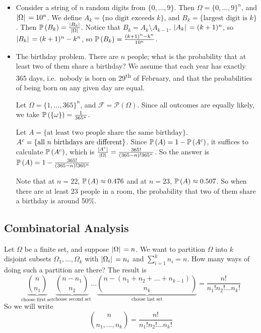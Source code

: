 \begin{itemize}
	\item Consider a string of \(n\) random digits from \(\{0, \dots, 9\}\).
	      Then \(\Omega = \{ 0, \dots, 9 \}^n\), and \(\abs*{\Omega} = 10^n\).
	      We define \(A_k = \{ \text{no digit exceeds } k \}\), and \(B_k = \{ \text{largest digit is } k \}\).
	      Then \(\mathbb{P}\left({B_k}\right) = \frac{\abs*{B_k}}{\abs*{\Omega}}\).
	      Notice that \(B_k = A_k \setminus A_{k-1}\).
	      \(\abs*{A_k} = (k+1)^n\), so \(\abs*{B_k} = (k+1)^n - k^n\), so \(\mathbb{P}\left({B_k}\right) = \frac{(k+1)^n - k^n}{10^n}\).
	      
	\item The birthday problem.
	      There are \(n\) people; what is the probability that at least two of them share a birthday?
	      We assume that each year has exactly 365 days, i.e.\ nobody is born on 29\textsuperscript{th} of February, and that the probabilities of being born on any given day are equal.
	      
	      Let \(\Omega = \{1, \dots, 365\}^n\), and \(\mathcal F = \mathcal P(\Omega)\).
	      Since all outcomes are equally likely, we take \(\mathbb{P}\left({\{\omega\}}\right) = \frac{1}{365^n}\).
	      
	      Let \(A = \{ \text{at least two people share the same birthday} \}\).
	      \({A}^c = \{ \text{all } n \text{ birthdays are different} \}\).
	      Since \(\mathbb{P}\left({A}\right) = 1 - \mathbb{P}\left({{A}^c}\right)\), it suffices to calculate \(\mathbb{P}\left({{A}^c}\right)\), which is \(\frac{\abs*{{A}^c}}{\abs*{\Omega}} = \frac{365!}{(365 - n)!365^n}\).
	      So the answer is \(\mathbb{P}\left({A}\right) = 1 - \frac{365!}{(365 - n)!365^n}\)
	      
	      Note that at \(n=22\), \(\mathbb{P}\left({A}\right) \approx 0.476\) and at \(n=23\), \(\mathbb{P}\left({A}\right) \approx 0.507\).
	      So when there are at least 23 people in a room, the probability that two of them share a birthday is around 50\%.
\end{itemize}

\subsection{Combinatorial Analysis}
Let \(\Omega\) be a finite set, and suppose \(\abs*{\Omega} = n\).
We want to partition \(\Omega\) into \(k\) disjoint subsets \(\Omega_1, \dots, \Omega_k\) with \(\abs*{\Omega_i} = n_i\) and \(\sum_{i=1}^k n_i = n\).
How many ways of doing such a partition are there?
The result is
\[
	\underbrace{\binom{n}{n_1}}_{\text{choose first set}}\underbrace{\binom{n-n_1}{n_2}}_{\text{choose second set}}\dots\underbrace{\binom{n-(n_1 + n_2 + \dots + n_{k-1})}{n_k}}_{\text{choose last set}} = \frac{n!}{n_1!n_2!\dots n_k!}
\]
So we will write
\[
	\binom{n}{n_1, \dots, n_k} = \frac{n!}{n_1!n_2!\dots n_k!}
\]

